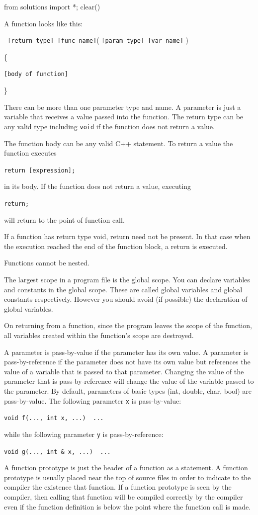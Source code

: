 \begin{python0}
from solutions import *; clear()
\end{python0}

A function looks like this:

\texttt{ [return type] [func name]}( \texttt{[param type] [var name]} )

\{

\texttt{[body of function]}

\}

There can be more than one parameter type and name. A parameter is just a variable that receives a value passed into the function. The return type can be any valid type including \texttt{void} if the function does not return a value.

The function body can be any valid C++ statement. To return a value the
function executes

\texttt{return [expression];}

in its body. If the function does not return a value, executing
\begin{center}
\texttt{return;}
\end{center}
will return to the point of function call.

If a function has return type void, return need not be present. In that case when the execution reached the end of the function block, a return is executed.

Functions cannot be nested.

The largest scope in a program file is the global scope. You can declare variables and constants in the global scope. These are called global variables and global constants respectively. However you should avoid (if possible) the declaration of global variables.

On returning from a function, since the program leaves the scope of the function, all variables created within the function's scope are destroyed.

A parameter is pass-by-value if the parameter has its own value. A parameter is pass-by-reference if the parameter does not have its own value but references the value of a variable that is passed to that parameter. Changing the value of the parameter that is pass-by-reference will change the value of the variable passed to the parameter. By default, parameters of basic types (int, double, char, bool) are pass-by-value. The following parameter \texttt{x} is pass-by-value:
\begin{center}
\texttt{void f(..., int x, ...) { ... }}
\end{center}
while the following parameter \texttt{y} is pass-by-reference:
\begin{center}
\texttt{void g(..., int \& x, ...) { ... }}
\end{center}
A function prototype is just the header of a function as a statement. A function prototype is usually placed near the top of source files in order to indicate to the compiler the existence that function. If a function prototype is seen by the compiler, then calling that function will be compiled correctly by the compiler even if the function definition is below the point where the function call is made.

